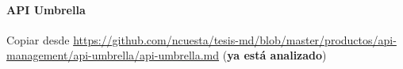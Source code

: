 \paragraph{API Umbrella}

Copiar desde \url{https://github.com/ncuesta/tesis-md/blob/master/productos/api-management/api-umbrella/api-umbrella.md} (\textbf{ya está analizado})
